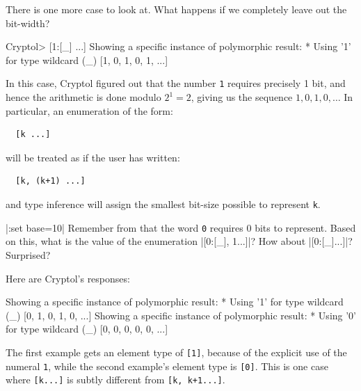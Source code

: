
There is one more case to look at. What happens if we completely leave
out the bit-width?
\begin{replPrompt}
  Cryptol> [1:[_] ...]
  Showing a specific instance of polymorphic result:
    * Using '1' for type wildcard (_)
  [1, 0, 1, 0, 1, ...]
\end{replPrompt}
In this case, Cryptol figured out that the number {\tt 1} requires
precisely 1 bit, and hence the arithmetic is done modulo $2^1 = 2$,
giving us the sequence $1,0,1,0,\ldots$ In particular, an
enumeration of the form:
\begin{Verbatim}
  [k ...]
\end{Verbatim}
will be treated as if the user has written:
\begin{Verbatim}
  [k, (k+1) ...]
\end{Verbatim}
and type inference will assign the smallest bit-size possible to
represent {\tt k}.

\restartrepl
\begin{Exercise}\label{ex:arith:9}
  \hidereplin|:set base=10|
  Remember from  that the word \texttt{0}
  requires 0 bits to represent. Based on this, what is the value of
  the enumeration \replin|[0:[_], 1...]|? How about
  \replin|[0:[_]...]|? Surprised?
\end{Exercise}
\begin{Answer}
Here are Cryptol's responses:\indModular\indEnum\indInfSeq
\begin{reploutVerb}
  Showing a specific instance of polymorphic result:
    * Using '1' for type wildcard (_)
  [0, 1, 0, 1, 0, ...]
  Showing a specific instance of polymorphic result:
    * Using '0' for type wildcard (_)
  [0, 0, 0, 0, 0, ...]
\end{reploutVerb}
The first example gets an element type of \texttt{[1]}, because of the
explicit use of the numeral \texttt{1}, while the second example's
element type is \texttt{[0]}. This is one case where \texttt{[k...]}
is subtly different from \texttt{[k, k+1...]}.
\end{Answer}

